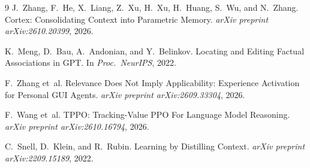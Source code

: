 \documentclass[11pt,a4paper]{article}
\begin{document}
\begin{thebibliography}{9}
J.~Zhang, F.~He, X.~Liang, Z.~Xu, H.~Xu, H.~Huang, S.~Wu, and N.~Zhang.
\newblock Cortex: Consolidating Context into Parametric Memory.
\newblock \emph{arXiv preprint arXiv:2610.20399}, 2026.

K.~Meng, D.~Bau, A.~Andonian, and Y.~Belinkov.
\newblock Locating and Editing Factual Associations in GPT.
\newblock In \emph{Proc.\ NeurIPS}, 2022.

F.~Zhang et~al.
\newblock Relevance Does Not Imply Applicability: Experience Activation for Personal GUI Agents.
\newblock \emph{arXiv preprint arXiv:2609.33304}, 2026.

F.~Wang et~al.
\newblock TPPO: Tracking-Value PPO For Language Model Reasoning.
\newblock \emph{arXiv preprint arXiv:2610.16794}, 2026.

C.~Snell, D.~Klein, and R.~Rubin.
\newblock Learning by Distilling Context.
\newblock \emph{arXiv preprint arXiv:2209.15189}, 2022.
\end{thebibliography}
\end{document}

